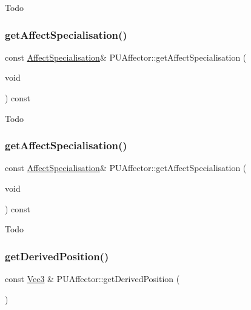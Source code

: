 Todo \mbox{\label{classPUAffector_a96326f08d83ecd04391412acf9642dd5}} 
\subsubsection{\texorpdfstring{get\+Affect\+Specialisation()}{getAffectSpecialisation()}\hspace{0.1cm}{\footnotesize\ttfamily [1/2]}}
{\footnotesize\ttfamily const \hyperlink{classPUAffector_aa4e8045ac29ee020895fd3e386935013}{Affect\+Specialisation}\& P\+U\+Affector\+::get\+Affect\+Specialisation (\begin{DoxyParamCaption}\item[{void}]{ }\end{DoxyParamCaption}) const\hspace{0.3cm}{\ttfamily [inline]}}

Todo \mbox{\label{classPUAffector_a96326f08d83ecd04391412acf9642dd5}} 
\subsubsection{\texorpdfstring{get\+Affect\+Specialisation()}{getAffectSpecialisation()}\hspace{0.1cm}{\footnotesize\ttfamily [2/2]}}
{\footnotesize\ttfamily const \hyperlink{classPUAffector_aa4e8045ac29ee020895fd3e386935013}{Affect\+Specialisation}\& P\+U\+Affector\+::get\+Affect\+Specialisation (\begin{DoxyParamCaption}\item[{void}]{ }\end{DoxyParamCaption}) const\hspace{0.3cm}{\ttfamily [inline]}}

Todo \mbox{\label{classPUAffector_aefcd7042173aba9533a02ff82f4cae44}} 
\subsubsection{\texorpdfstring{get\+Derived\+Position()}{getDerivedPosition()}\hspace{0.1cm}{\footnotesize\ttfamily [1/2]}}
{\footnotesize\ttfamily const \hyperlink{classVec3}{Vec3} \& P\+U\+Affector\+::get\+Derived\+Position (\begin{DoxyParamCaption}{ }\end{DoxyParamCaption})}


